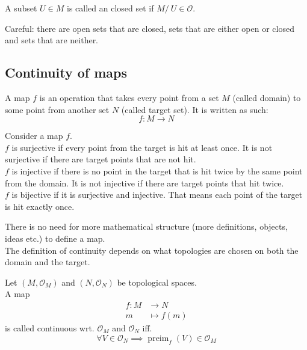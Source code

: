 \begin{framed}
\begin{definition}
    A subset $U \in M$ is called an closed set if $M /\ U \in \mathcal{O}$.
\end{definition}
\end{framed}

Careful: there are open sets that are closed, sets that are either open or closed and sets that are neither.


\subsection{Continuity of maps}

A map $f$ is an operation that takes every point from a set $M$ (called domain) to some point from another set $N$ (called target set). It is written as such:
$$f:M \longrightarrow N $$

\begin{framed}
\begin{definition} Consider a map $f$.\\
    $f$ is surjective if every point from the target is hit at least once. It is not surjective if there are target points that are not hit.\\
    $f$ is injective if there is no point in the target that is hit twice by the same point from the domain. It is not injective if there are target points that hit twice.\\
    $f$ is bijective if it is surjective and injective. That means each point of the target is hit exactly once. 
\end{definition}
\end{framed}

There is no need for more mathematical structure (more definitions, objects, ideas etc.) to define a map.\\

The definition of continuity depends on what topologies are chosen on both the domain and the target.

\begin{framed}
\begin{definition}
    Let $(M,\mathcal{O}_M)$ and $(N,\mathcal{O}_N)$ be topological spaces.\\
    A map
    \begin{align*}
        f:M & \longrightarrow N \\
        m&\mapsto f(m)
    \end{align*}
    is called continuous wrt. $\mathcal{O}_M$ and $\mathcal{O}_N$ iff.
    $$\forall V\in\mathcal{O}_N \implies \operatorname{preim}_f(V) \in \mathcal{O}_M$$
\end{definition}
\end{framed}

